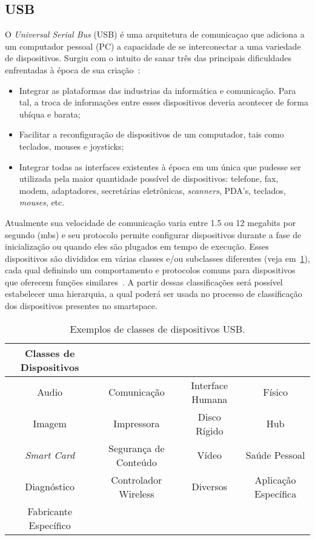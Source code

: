 \subsection{USB}

O \emph{Universal Serial Bus} (USB) é uma arquitetura de comunicaçao que adiciona a um computador pessoal (PC) a capacidade de se interconectar a uma variedade de dispositivos. Surgiu com o intuito de sanar três das principais dificuldades enfrentadas à época de sua criação~\cite{usbspec}:

\begin{itemize}
	\item Integrar as plataformas das industrias da informática e comunicação. Para tal, a troca de informações entre esses dispositivos deveria acontecer de forma ubíqua e barata;
	\item Facilitar a reconfiguração de dispositivos de um computador, tais como teclados, mouses e joysticks;
	\item Integrar todas as interfaces existentes à época em um única que pudesse ser utilizada pela maior quantidade possível de dispositivos: telefone, fax, modem, adaptadores, secretárias eletrônicas, \emph{scanners}, PDA's, teclados, \emph{mouses}, etc.
\end{itemize}

Atualmente sua velocidade de comunicação varia entre 1.5 ou 12 megabits por segundo (mbs) e seu protocolo permite configurar dispositivos durante a fase de inicialização ou quando eles são plugados em tempo de execução. Esses dispositivos são divididos em várias classes e/ou subclasses diferentes (veja em~\ref{tab:dispositivos_usb}), cada qual definindo um comportamento e protocolos comuns para dispositivos que oferecem funções similares~\cite{hid}. A partir dessas classificações será possível estabelecer uma hierarquia, a qual poderá ser usada no processo de classificação dos dispositivos presentes no smartspace.

\begin{table}
	\begin{center}
		\begin{tabular}{cccc}
		\hline
		\textbf{Classes de Dispositivos}																		\\
		\hline
		Audio					&	Comunicação				&	Interface Humana	&	Físico 					\\
		\hline
		Imagem					&	Impressora				&	Disco Rígido		&	Hub 					\\
		\hline
		\emph{Smart Card}		&	Segurança de Conteúdo	&	Vídeo				&	Saúde Pessoal 			\\
		\hline
		Diagnóstico				& Controlador Wireless		&	Diversos			&	Aplicação Específica	\\
		\hline
		Fabricante Específico	&							&						&							\\
		\hline
		\end{tabular}
	\end{center}
	\caption{Exemplos de classes de dispositivos USB.}
	\label{tab:dispositivos_usb}
\end{table}

